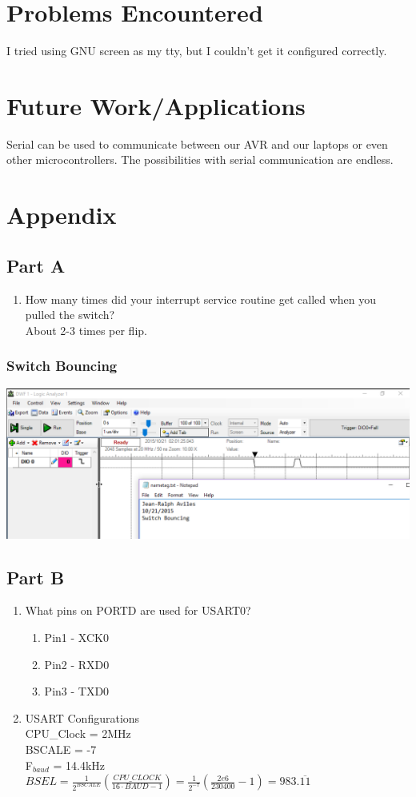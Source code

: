 \documentclass[letterpaper, 12pt]{article}
\begin{document}
\section*{Problems Encountered}
I tried using GNU screen as my tty, but I couldn't get it configured correctly.
\section*{Future Work/Applications}
Serial can be used to communicate between our AVR and our laptops or even other microcontrollers. The possibilities with serial communication are endless.
\section*{Appendix}
\subsection*{Part A}
\begin{enumerate}
    \item How many times did your interrupt service routine get called when you pulled the switch? \\
      \hspace*{8pt} About 2-3 times per flip.
\end{enumerate}
\subsubsection*{Switch Bouncing}
\begin{center}
  \includegraphics[scale=0.5]{bouncing}
\end{center}
\subsection*{Part B}
\begin{enumerate}
    \item What pins on PORTD are used for USART0?
      \begin{enumerate}
          \item Pin1 - XCK0
          \item Pin2 - RXD0
          \item Pin3 - TXD0
      \end{enumerate}
    \item USART Configurations \\
    CPU\_Clock = 2MHz \\
    BSCALE = -7 \\
    F$_{baud}$ = 14.4kHz \\
    \( BSEL = \frac{1}{2^{BSCALE}}\left( \frac{CPU\_CLOCK}{16\cdot BAUD -1}\right) = \frac{1}{2^{-7}}\left(\frac{2e6}{230400}-1\right) = 983.\overline{11} \)
\end{enumerate}
\end{document}
